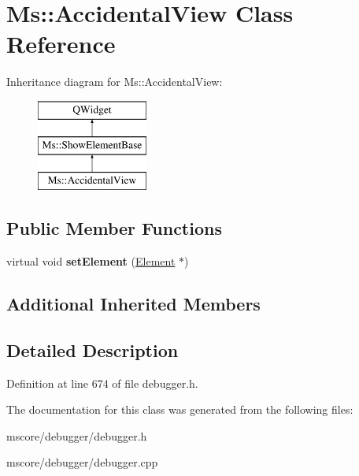 \hypertarget{class_ms_1_1_accidental_view}{}\section{Ms\+:\+:Accidental\+View Class Reference}
\label{class_ms_1_1_accidental_view}
Inheritance diagram for Ms\+:\+:Accidental\+View\+:\begin{figure}[H]
\begin{center}
\leavevmode
\includegraphics[height=3.000000cm]{class_ms_1_1_accidental_view}
\end{center}
\end{figure}
\subsection*{Public Member Functions}
\begin{DoxyCompactItemize}
\item 
\mbox{\label{class_ms_1_1_accidental_view_a4239bea9ac7a33261c89fb6c93538148}} 
virtual void {\bfseries set\+Element} (\hyperlink{class_ms_1_1_element}{Element} $\ast$)
\end{DoxyCompactItemize}
\subsection*{Additional Inherited Members}


\subsection{Detailed Description}


Definition at line 674 of file debugger.\+h.



The documentation for this class was generated from the following files\+:\begin{DoxyCompactItemize}
\item 
mscore/debugger/debugger.\+h\item 
mscore/debugger/debugger.\+cpp\end{DoxyCompactItemize}
